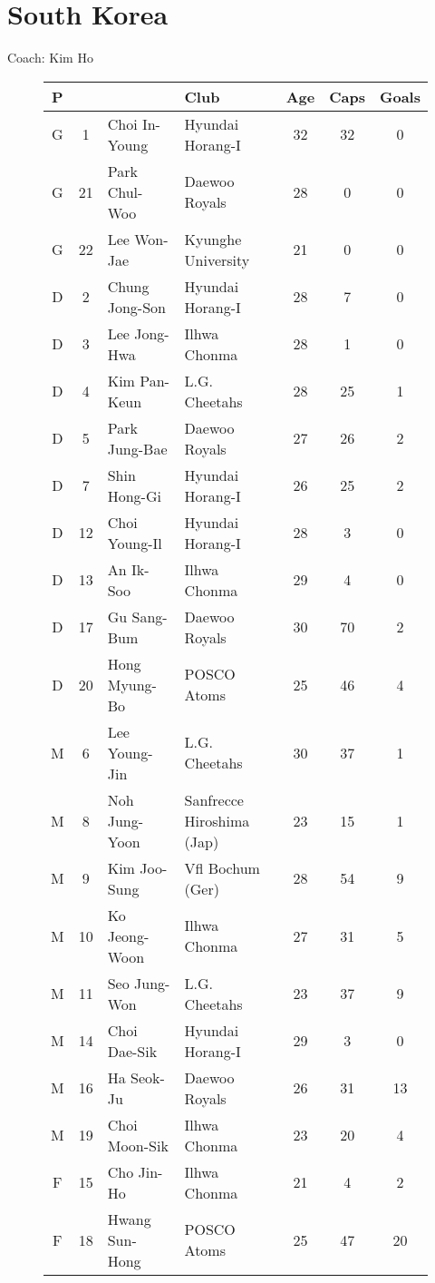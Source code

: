 \chapter{South Korea}
\newline
\newline
Coach: Kim Ho
\begin{figure}[H]
\begin{tabular}{c c l l c c c}
P & & & Club & Age & Caps & Goals \\ \hline
G & 1 & Choi In-Young & Hyundai Horang-I & 32 & 32 & 0 \\
G & 21 & Park Chul-Woo & Daewoo Royals & 28 & 0 & 0 \\
G & 22 & Lee Won-Jae & Kyunghe University & 21 & 0 & 0 \\ \hline
D & 2 & Chung Jong-Son & Hyundai Horang-I & 28 & 7 & 0 \\
D & 3 & Lee Jong-Hwa & Ilhwa Chonma & 28 & 1 & 0 \\
D & 4 & Kim Pan-Keun & L.G. Cheetahs & 28 & 25 & 1 \\
D & 5 & Park Jung-Bae & Daewoo Royals & 27 & 26 & 2 \\
D & 7 & Shin Hong-Gi & Hyundai Horang-I & 26 & 25 & 2 \\
D & 12 & Choi Young-Il & Hyundai Horang-I & 28 & 3 & 0 \\
D & 13 & An Ik-Soo & Ilhwa Chonma & 29 & 4 & 0 \\
D & 17 & Gu Sang-Bum & Daewoo Royals & 30 & 70 & 2 \\
D & 20 & Hong Myung-Bo & POSCO Atoms & 25 & 46 & 4 \\ \hline
M & 6 & Lee Young-Jin & L.G. Cheetahs & 30 & 37 & 1 \\
M & 8 & Noh Jung-Yoon & Sanfrecce Hiroshima (Jap) & 23 & 15 & 1 \\
M & 9 & Kim Joo-Sung & Vfl Bochum (Ger) & 28 & 54& 9 \\
M & 10 & Ko Jeong-Woon & Ilhwa Chonma & 27 & 31 & 5 \\
M & 11 & Seo Jung-Won & L.G. Cheetahs & 23 & 37 & 9 \\
M & 14 & Choi Dae-Sik & Hyundai Horang-I & 29 & 3 & 0 \\
M & 16 & Ha Seok-Ju & Daewoo Royals & 26 & 31 & 13 \\
M & 19 & Choi Moon-Sik & Ilhwa Chonma & 23 & 20 & 4 \\ \hline
F & 15 & Cho Jin-Ho & Ilhwa Chonma & 21 & 4 & 2 \\
F & 18 & Hwang Sun-Hong & POSCO Atoms & 25 & 47 & 20 \\ \hline
\end{tabular}
\end{figure}

